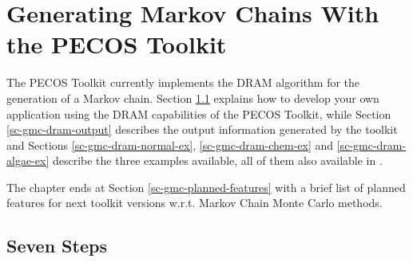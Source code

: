 \chapter{Generating Markov Chains With the PECOS Toolkit}\label{ch-gmc}
\thispagestyle{headings}

The PECOS Toolkit currently implements the DRAM algorithm \cite{HaLaMiSa06} for the generation of a Markov chain.
Section \ref{sc-gmc-seven-steps} explains how to develop your own application using the DRAM capabilities of the PECOS Toolkit, while
Section \ref{sc-gmc-dram-output} describes the output information generated by the toolkit and
Sections
\ref{sc-gmc-dram-normal-ex},
\ref{sc-gmc-dram-chem-ex} and
\ref{sc-gmc-dram-algae-ex}
describe the three examples available,
all of them also available in \cite{mcmctool}.

The chapter ends at Section \ref{sc-gmc-planned-features} with a brief list of planned features for next toolkit versions w.r.t. Markov Chain Monte Carlo methods.

\section{Seven Steps}\label{sc-gmc-seven-steps}


